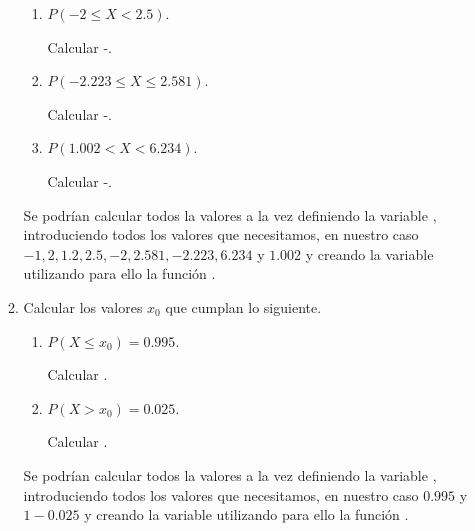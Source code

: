 \begin{enumerate}[leftmargin=*]
\begin{enumerate}
\begin{enumerate}
\item $P(-2\leq X < 2.5)$.
\begin{indicacion}
Calcular
-.
\end{indicacion}

\item $P(-2.223\leq X \leq 2.581)$.
\begin{indicacion}
Calcular
-.
\end{indicacion}

\item $P(1.002< X < 6.234)$.
\begin{indicacion}
Calcular
-.
\end{indicacion}

\end{enumerate}

\begin{indicacion}
Se podrían calcular todos la valores a la vez definiendo la variable 
, introduciendo todos los valores que
necesitamos, en nuestro caso $-1, 2, 1.2, 2.5, -2, 2.581, -2.223, 6.234$ 
y $1.002$ y creando la variable  utilizando 
para ello la función .
\end{indicacion}

\item Calcular los valores $x_0$ que cumplan lo siguiente.
\begin{enumerate}
\item $P(X\leq x_0)=0.995$.
\begin{indicacion}
Calcular .
\end{indicacion}

\item $P(X> x_0)=0.025$.
\begin{indicacion}
Calcular .
\end{indicacion}
\end{enumerate}

\begin{indicacion}
Se podrían calcular todos la valores a la vez definiendo la variable 
, introduciendo todos los valores que
necesitamos, en nuestro caso $0.995$ y $1-0.025$ y creando la variable 
 utilizando para ello la
función .
\end{indicacion}
\end{enumerate}


\end{enumerate}
